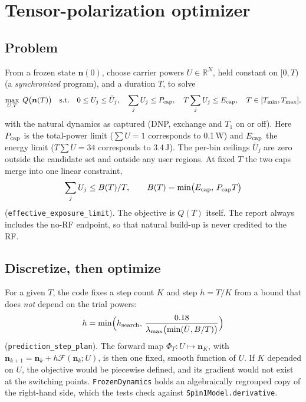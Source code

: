 \documentclass[11pt]{article}
\newcommand{\code}[1]{\texttt{#1}}
\begin{document}
\section{Tensor-polarization optimizer}
\label{sec:optimizer}

\subsection{Problem}

From a frozen state \(\bm n(0)\), choose carrier powers \(U\in\mathbb{R}^N\), held constant on
\([0,T)\) (a \emph{synchronized} program), and a duration \(T\), to solve
\begin{equation}
\max_{U,T}\;Q\bigl(\bm n(T)\bigr)\quad\text{s.t.}\quad 0\le U_j\le \bar U_j,\quad
\sum_jU_j\le P_{\rm cap},\quad T\sum_jU_j\le E_{\rm cap},\quad T\in[T_{\min},T_{\max}],
\label{eq:problem}
\end{equation}
with the natural dynamics as captured (DNP, exchange and \(T_1\) on or off). Here
\(P_{\rm cap}\) is the total-power limit (\(\sum U=1\) corresponds to 0.1\,W) and \(E_{\rm cap}\)
the energy limit (\(T\sum U=34\) corresponds to 3.4\,J). The per-bin ceilings \(\bar U_j\) are
zero outside the candidate set and outside any user regions. At fixed \(T\) the two caps merge
into one linear constraint,
\begin{equation}
\sum_jU_j\le B(T)/T,\qquad B(T)=\min\bigl(E_{\rm cap},\,P_{\rm cap}T\bigr)
\label{eq:budget}
\end{equation}
(\code{effective\_exposure\_limit}). The objective is \(Q(T)\) itself. The report always
includes the no-RF endpoint, so that natural build-up is never credited to the RF.

\subsection{Discretize, then optimize}

For a given \(T\), the code fixes a step count \(K\) and step \(h=T/K\) from a bound that does
\emph{not} depend on the trial powers:
\begin{equation}
h=\min\Bigl(h_{\rm search},\,\frac{0.18}{\lambda_{\max}\bigl(\min(\bar U,B/T)\bigr)}\Bigr)
\end{equation}
(\code{prediction\_step\_plan}). The forward map
\(\Phi_T:U\mapsto \bm n_K\), with \(\bm n_{k+1}=\bm n_k+h\mathcal F(\bm n_k;U)\), is then one
fixed, smooth function of \(U\). If \(K\) depended on \(U\), the objective would be piecewise
defined, and its gradient would not exist at the switching points. \code{FrozenDynamics} holds an
algebraically regrouped copy of the right-hand side, which the tests check against
\code{Spin1Model.derivative}.
\end{document}
